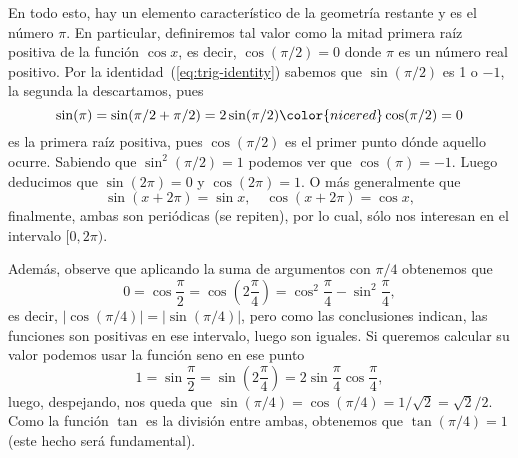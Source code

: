 \documentclass[11pt,oneside,a4paper]{book}
\begin{document}
En todo esto, hay un elemento característico de la geometría restante y es el número $\pi$. En particular, definiremos tal valor como la mitad primera raíz positiva de la función $\cos x$, es decir, $\cos(\pi/2)=0$ donde $\pi$ es un número real positivo. Por la identidad~(\ref{eq:trig-identity}) sabemos que $\sin(\pi/2)$ es 1 o $-1$, la segunda la descartamos, pues
$$\sin(\pi)=\sin(\pi/2+\pi/2)=2\sin(\pi/2){\color{nicered}\cos(\pi/2)}=0$$
es la primera raíz positiva, pues $\cos(\pi/2)$ es el primer punto dónde aquello ocurre. Sabiendo que $\sin^2(\pi/2)=1$ podemos ver que $\cos(\pi)=-1$. Luego deducimos que $\sin(2\pi)=0$ y $\cos(2\pi)=1$. O más generalmente que
\begin{equation}
\sin(x+2\pi)=\sin x,\quad\cos(x+2\pi)=\cos x,
\end{equation}
finalmente, ambas son periódicas (se repiten), por lo cual, sólo nos interesan en el intervalo $[0,2\pi)$.
\begin{figure}
\centering
{}
\caption{}
\end{figure}

Además, observe que aplicando la suma de argumentos con $\pi/4$ obtenemos que
$$0=\cos\frac{\pi}{2}=\cos\left(2\frac{\pi}{4}\right)=\cos^2\frac{\pi}{4}-\sin^2\frac{\pi}{4},$$
es decir, $|\cos(\pi/4)|=|\sin(\pi/4)|$, pero como las conclusiones indican, las funciones son positivas en ese intervalo, luego son iguales. Si queremos calcular su valor podemos usar la función seno en ese punto
$$1=\sin\frac{\pi}{2}=\sin\left(2\frac{\pi}{4}\right)=2\sin\frac{\pi}{4}\cos\frac{\pi}{4},$$
luego, despejando, nos queda que $\sin(\pi/4)=\cos(\pi/4)=1/\sqrt{2}=\sqrt{2}/2$. Como la función $\tan$ es la división entre ambas, obtenemos que $\tan(\pi/4)=1$ (este hecho será fundamental).
\end{document}
